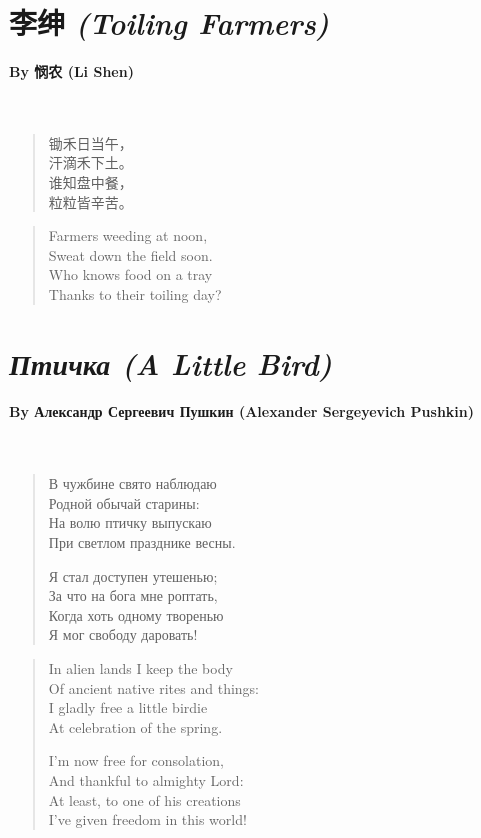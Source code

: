 \documentclass[12pt, openany, letterpaper]{memoir}
\begin{document}
\newpage
\section*{{李绅} \emph{(Toiling Farmers)}}
\paragraph{By {悯农} (Li Shen)}~

{
\begin{verse}
	锄禾日当午，\\
	汗滴禾下土。\\
	谁知盘中餐，\\
	粒粒皆辛苦。
\end{verse}
}

\vspace{2em}
\begin{verse}
	Farmers weeding at noon,\\
	Sweat down the field soon.\\
	Who knows food on a tray\\
	Thanks to their toiling day?
\end{verse}

\newpage
\section*{\emph{Птичка (A Little Bird)}}
\paragraph{By Александр Сергеевич Пушкин (Alexander Sergeyevich Pushkin)}~

\begin{verse}
	В чужбине свято наблюдаю\\
	Родной обычай старины:\\
	На волю птичку выпускаю\\
	При светлом празднике весны. 
	
	Я стал доступен утешенью;\\
	За что на бога мне роптать,\\
	Когда хоть одному творенью\\
	Я мог свободу даровать! 
\end{verse}

\vspace{2em}
\begin{verse}
	In alien lands I keep the body\\
	Of ancient native rites and things:\\
	I gladly free a little birdie\\
	At celebration of the spring.
	
	
	I'm now free for consolation,\\
	And thankful to almighty Lord:\\
	At least, to one of his creations\\
	I've given freedom in this world!
\end{verse}
\end{document}
